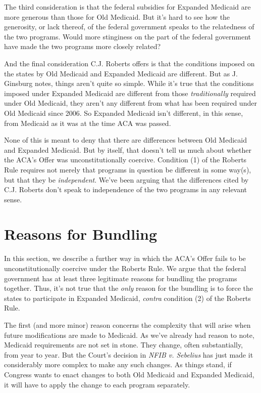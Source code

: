 \documentclass[
  11pt,
  letterpaper,
  DIV=11,
  numbers=noendperiod,
  oneside]{scrartcl}
\begin{document}
The third consideration is that the federal subsidies for Expanded
Medicaid are more generous than those for Old Medicaid. But it's hard to see how the generosity, or lack
thereof, of the federal government speaks to the relatedness of the two
programs. Would more stinginess on the part of the federal government
have made the two programs more closely related?

And the final consideration C.J. Roberts offers is that the conditions
imposed on the states by Old Medicaid and Expanded Medicaid are
different. But as J. Ginsburg notes, things aren't quite so simple.
While it's true that the conditions imposed under Expanded Medicaid are
different from those \emph{traditionally} required under Old Medicaid,
they aren't any different from what has been required under Old Medicaid
since 2006. So Expanded Medicaid isn't different, in this sense, from
Medicaid as it was at the time ACA was passed.

None of this is meant to deny that there are differences between Old
Medicaid and Expanded Medicaid. But by itself, that doesn't tell us much
about whether the ACA's Offer was unconstitutionally coercive. Condition
(1) of the Roberts Rule requires not merely that programs in question be
different in some way(s), but that they be \emph{independent}. We've
been arguing that the differences cited by C.J. Roberts don't speak to
independence of the two programs in any relevant sense.

\section{Reasons for Bundling}\label{reasons-for-bundling}

In this section, we describe a further way in which the ACA's Offer
fails to be unconstitutionally coercive under the Roberts Rule. We argue
that the federal government has at least three legitimate reasons for
bundling the programs together. Thus, it's not true that the \emph{only}
reason for the bundling is to force the states to participate in
Expanded Medicaid, \emph{contra} condition (2) of the Roberts Rule.

The first (and more minor) reason concerns the complexity that will
arise when future modifications are made to Medicaid. As we've already
had reason to note, Medicaid requirements are not set in
stone. They change, often substantially, from
year to year. But the Court's decision in \emph{NFIB v. Sebelius} has
just made it considerably more complex to make any such changes. As
things stand, if Congress wants to enact changes to both Old Medicaid
and Expanded Medicaid, it will have to apply the change to each program
separately.
\end{document}
